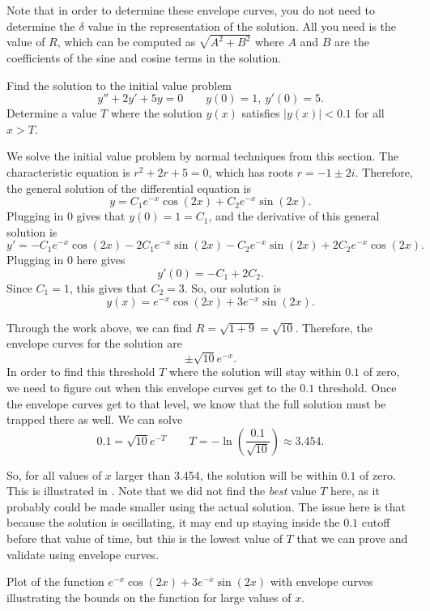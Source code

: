Note that in order to determine these envelope curves, you do not need to determine the $\delta$ value in the representation of the solution. All you need is the value of $R$, which can be computed as $\sqrt{A^2 + B^2}$ where $A$ and $B$ are the coefficients of the sine and cosine terms in the solution. 

\begin{example}
Find the solution to the initial value problem
\[ y'' + 2y' + 5y = 0 \qquad y(0) = 1,\ y'(0) = 5. \]
Determine a value $T$ where the solution $y(x)$ satisfies $|y(x)| < 0.1$ for all $x > T$. 
\end{example}

\begin{exampleSol}
We solve the initial value problem by normal techniques from this section. The characteristic equation is $r^2 + 2r + 5 = 0$, which has roots $r = -1 \pm 2i$. Therefore, the general solution of the differential equation is
\[ y = C_1e^{-x}\cos(2x) + C_2 e^{-x}\sin(2x). \]
Plugging in $0$ gives that $y(0) = 1 = C_1$, and the derivative of this general solution is
\[ y' = -C_1e^{-x}\cos(2x) -2C_1e^{-x}\sin(2x) - C_2e^{-x}\sin(2x) + 2C_2e^{-x}\cos(2x). \] Plugging in $0$ here gives
\[ y'(0) = -C_1 + 2C_2. \] Since $C_1 = 1$, this gives that $C_2 = 3$. So, our solution is
\[ y(x) = e^{-x}\cos(2x) + 3e^{-x}\sin(2x). \]

Through the work above, we can find $R = \sqrt{1 + 9} = \sqrt{10}$. Therefore, the envelope curves for the solution are
\[ \pm \sqrt{10}e^{-x}. \] In order to find this threshold $T$ where the solution will stay within $0.1$ of zero, we need to figure out when this envelope curves get to the $0.1$ threshold. Once the envelope curves get to that level, we know that the full solution must be trapped there as well. We can solve
\[ 0.1 = \sqrt{10}e^{-T} \qquad T = - \ln\left(\frac{0.1}{\sqrt{10}}\right) \approx 3.454. \]

So, for all values of $x$ larger than 3.454, the solution will be within $0.1$ of zero. This is illustrated in . Note that we did not find the \emph{best} value $T$ here, as it probably could be made smaller using the actual solution. The issue here is that because the solution is oscillating, it may end up staying inside the $0.1$ cutoff before that value of time, but this is the lowest value of $T$ that we can prove and validate using envelope curves.
\end{exampleSol}

\begin{myfig}
\capstart
{}
\caption{Plot of the function $e^{-x}\cos(2x) + 3e^{-x}\sin(2x)$ with envelope curves illustrating the bounds on the function for large values of $x$. \label{envBounds:fig}}
\end{myfig}



